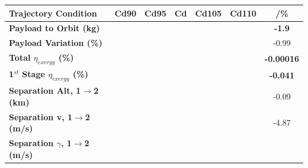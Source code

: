 \begin{table}[ht!]
	\centering
	\begin{tabular}{l c c c c c c} 
		\hline \textbf{Trajectory Condition}
		&Cd90
		&Cd95
		&Cd
		&Cd105
		&Cd110
		& /\%
		\\
		\hline \textbf{Payload to Orbit (kg)}
		& \textbf{\PayloadToOrbitCdNinetyNoReturn}
		& \textbf{\PayloadToOrbitCdNinetyFiveNoReturn}
		& \textbf{\PayloadToOrbitCdStandardNoReturn}
		& \textbf{\PayloadToOrbitCdOneHundredFiveNoReturn}
		& \textbf{\PayloadToOrbitCdOneHundredTenNoReturn}
		&\textbf{-1.9}
		\\
		\textbf{Payload Variation (\%)}
		& \PayloadVarCdNinetyNoReturn
		& \PayloadVarCdNinetyFiveNoReturn
		& \PayloadVarCdStandardNoReturn
		& \PayloadVarCdOneHundredFiveNoReturn
		& \PayloadVarCdOneHundredTenNoReturn
		&-0.99
		\\
		\textbf{Total $\eta_{exergy}$ (\%)}
		& \textbf{\totalExergyEffCdNinetyNoReturn}
		& \textbf{\totalExergyEffCdNinetyFiveNoReturn}
		& \textbf{\totalExergyEffCdStandardNoReturn}
		& \textbf{\totalExergyEffCdOneHundredFiveNoReturn}
		& \textbf{\totalExergyEffCdOneHundredTenNoReturn}
		& \textbf{-0.00016}
		\\
		\hline 
		\textbf{1$^{st}$ Stage $\eta_{exergy}$ (\%)}
		& \textbf{\firstExergyEffCdNinetyNoReturn}
		& \textbf{\firstExergyEffCdNinetyFiveNoReturn}
		& \textbf{\firstExergyEffCdStandardNoReturn}
		& \textbf{\firstExergyEffCdOneHundredFiveNoReturn}
		& \textbf{\firstExergyEffCdOneHundredTenNoReturn}
		& \textbf{-0.041}
		\\
		\textbf{Separation Alt, 1$\rightarrow$2 (km)}
		& \firstsecondSeparationAltCdNinetyNoReturn
		& \firstsecondSeparationAltCdNinetyFiveNoReturn
		& \firstsecondSeparationAltCdStandardNoReturn
		& \firstsecondSeparationAltCdOneHundredFiveNoReturn
		& \firstsecondSeparationAltCdOneHundredTenNoReturn
		&-0.09
		\\
		\textbf{Separation v, 1$\rightarrow$2 (m/s)}
		& \firstsecondSeparationvCdNinetyNoReturn
		& \firstsecondSeparationvCdNinetyFiveNoReturn
		& \firstsecondSeparationvCdStandardNoReturn
		& \firstsecondSeparationvCdOneHundredFiveNoReturn
		& \firstsecondSeparationvCdOneHundredTenNoReturn
		&-4.87
		\\
		\textbf{Separation $\gamma$, 1$\rightarrow$2 (m/s)}
		& \firstsecondSeparationgammaCdNinetyNoReturn
		& \firstsecondSeparationgammaCdNinetyFiveNoReturn
		& \firstsecondSeparationgammaCdStandardNoReturn
		& \firstsecondSeparationgammaCdOneHundredFiveNoReturn
		& \firstsecondSeparationgammaCdOneHundredTenNoReturn

\end{tabular}
\end{table}
